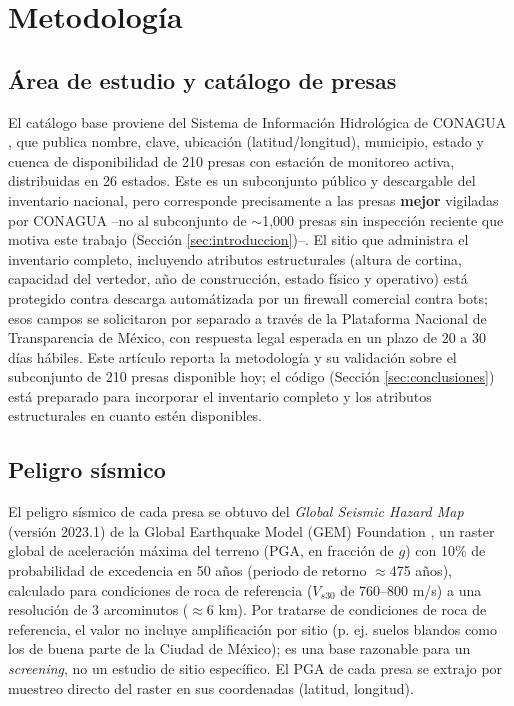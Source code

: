 \section{Metodolog\'ia}
\label{sec:metodologia}

\subsection{\'Area de estudio y cat\'alogo de presas}

El cat\'alogo base proviene del Sistema de Informaci\'on Hidrol\'ogica de CONAGUA \cite{sih2026catalogo}, que publica nombre, clave, ubicaci\'on (latitud/longitud), municipio, estado y cuenca de disponibilidad de 210 presas con estaci\'on de monitoreo activa, distribuidas en 26 estados. Este es un subconjunto p\'ublico y descargable del inventario nacional, pero corresponde precisamente a las presas \textbf{mejor} vigiladas por CONAGUA --no al subconjunto de \(\sim\)1{,}000 presas sin inspecci\'on reciente que motiva este trabajo (Secci\'on \ref{sec:introduccion})--. El sitio que administra el inventario completo, incluyendo atributos estructurales (altura de cortina, capacidad del vertedor, a\~no de construcci\'on, estado f\'isico y operativo) est\'a protegido contra descarga autom\'atizada por un firewall comercial contra bots; esos campos se solicitaron por separado a trav\'es de la Plataforma Nacional de Transparencia de M\'exico, con respuesta legal esperada en un plazo de 20 a 30 d\'ias h\'abiles. Este art\'iculo reporta la metodolog\'ia y su validaci\'on sobre el subconjunto de 210 presas disponible hoy; el c\'odigo (Secci\'on \ref{sec:conclusiones}) est\'a preparado para incorporar el inventario completo y los atributos estructurales en cuanto est\'en disponibles.

\subsection{Peligro s\'ismico}
\label{sec:metodologia_sismico}

El peligro s\'ismico de cada presa se obtuvo del \emph{Global Seismic Hazard Map} (versi\'on 2023.1) de la Global Earthquake Model (GEM) Foundation \cite{gem2023hazard}, un raster global de aceleraci\'on m\'axima del terreno (PGA, en fracci\'on de $g$) con 10\% de probabilidad de excedencia en 50 a\~nos (periodo de retorno \(\approx\)475 a\~nos), calculado para condiciones de roca de referencia (\(V_{s30}\) de 760--800 m/s) a una resoluci\'on de 3 arcominutos (\(\approx\)6 km). Por tratarse de condiciones de roca de referencia, el valor no incluye amplificaci\'on por sitio (p. ej. suelos blandos como los de buena parte de la Ciudad de M\'exico); es una base razonable para un \emph{screening}, no un estudio de sitio espec\'ifico. El PGA de cada presa se extrajo por muestreo directo del raster en sus coordenadas (latitud, longitud).

